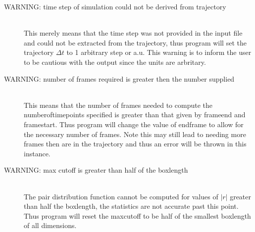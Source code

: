 \documentclass{article}
\begin{document}
\begin{description}
	\item[WARNING: time step of simulation could not be derived from trajectory] \hfill \\
	This merely means that the time step was not provided in the input file and could not be extracted from the trajectory, thus program will set the trajectory $\Delta t$ to 1 arbitrary step or a.u.  This warning is to inform the user to be cautious with the output since the units are arbritary.
	
	\item[WARNING: number of frames required is greater then the number supplied] \hfill \\
	This means that the number of frames needed to compute the numberoftimepoints specified is greater than that given by frameend and framestart. Thus program will change the value of endframe to allow for the necessary number of frames.  Note this may still lead to needing more frames then are in the trajectory and thus an error will be thrown in this instance.
	
	\item[WARNING: max cutoff is greater than half of the boxlength] \hfill \\
	The pair distribution function cannot be computed for values of $|r|$ greater than half the boxlength, the statistics are not accurate past this point.  Thus program will reset the maxcutoff to be half of the smallest boxlength of all dimensions.
	
	
\end{description}
\end{document}
